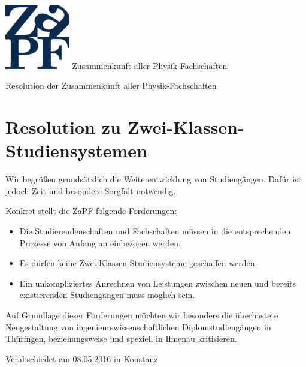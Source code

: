 \documentclass[DIV=calc]{scrartcl}
\begin{document}
\hspace{0.87\textwidth}
\begin{minipage}{120pt}
\vspace{-1.8cm}
\includegraphics[width=80pt]{logo.pdf}
\centering
\small Zusammenkunft aller Physik-Fachschaften
\end{minipage}
\begin{center}
\huge{Resolution der Zusammenkunft aller Physik-Fachschaften} \\
\normalsize
\end{center}

\vspace{1cm}
\section*{Resolution zu Zwei-Klassen-Studiensystemen}


Wir begrüßen grundsätzlich die Weiterentwicklung von Studiengängen. Dafür ist jedoch Zeit und besondere Sorgfalt notwendig.

Konkret stellt die ZaPF folgende Forderungen:
\begin{itemize}
        \item Die Studierendenschaften und Fachschaften müssen in die entsprechenden Prozesse von Anfang an einbezogen werden.
        \item Es dürfen keine Zwei-Klassen-Studiensysteme geschaffen werden.
        \item Ein unkompliziertes  Anrechnen von Leistungen zwischen neuen und bereits existierenden Studiengängen muss möglich sein.
\end{itemize}

Auf Grundlage dieser Forderungen möchten wir besonders die überhastete Neugestaltung von ingenieurswissenschaftlichen
Diplomstudiengängen in Thüringen, beziehungsweise und speziell in Ilmenau kritisieren.

\vfill
\begin{flushright}
Verabschiedet am 08.05.2016 in Konstanz
\end{flushright}
\end{document}

